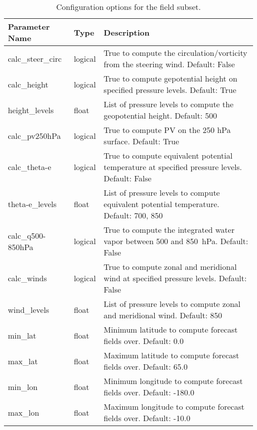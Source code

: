 \documentclass[psfig,12pt]{article}
\begin{document}
\begin{table}[H]
\caption{Configuration options for the field subset.}
\begin{center}
\begin{tabular}{|p{1.25in}|p{0.5in}|p{4.5in}|}
\hline
Parameter Name & Type & Description \\ \hline \hline
calc\_steer\_circ & logical & True to compute the circulation/vorticity from the steering wind.  
Default:  False \\ \hline
calc\_height & logical & True to compute gepotential height on specified pressure levels.  Default:  True \\ \hline
height\_levels & float & List of pressure levels to compute the geopotential height.
Default:  500 \\ \hline
calc\_pv250hPa & logical & True to compute PV on the 250 hPa surface.  Default:  True \\ \hline
calc\_theta-e & logical & True to compute equivalent potential temperature at specified pressure levels.
Default:  False \\ \hline
theta-e\_levels & float & List of pressure levels to compute equivalent potential temperature.
Default:  700, 850 \\ \hline
calc\_q500-850hPa & logical & True to compute the integrated water vapor between 500 and 
850~hPa.  Default:  False \\ \hline
calc\_winds & logical & True to compute zonal and meridional wind at specified pressure levels.
Default:  False \\ \hline
wind\_levels & float & List of pressure levels to compute zonal and meridional wind.
Default:  850 \\ \hline
min\_lat & float & Minimum latitude to compute forecast fields over.  Default:  0.0 \\ \hline
max\_lat & float & Maximum latitude to compute forecast fields over.  Default:  65.0 \\ \hline
min\_lon & float & Minimum longitude to compute forecast fields over.  Default:  -180.0 \\ \hline
max\_lon & float & Maximum longitude to compute forecast fields over.  Default:  -10.0 \\ \hline
\end{tabular}
\end{center}
\end{table}
\end{document}
